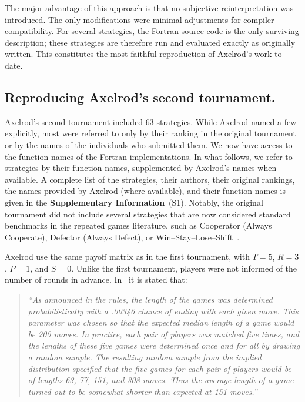 \documentclass{article}
\newcommand{\SI}{\textbf{Supplementary Information}}
\begin{document}
The major advantage of this approach is that no subjective reinterpretation was
introduced. The only modifications were minimal adjustments for compiler
compatibility. For several strategies, the Fortran source code is the only
surviving description; these strategies are therefore run and evaluated exactly
as originally written. This constitutes the most faithful reproduction of
Axelrod's work to date.

\subsection*{Reproducing Axelrod's second tournament.}

Axelrod's second tournament included 63 strategies. While Axelrod named a few
explicitly, most were referred to only by their ranking in the original
tournament or by the names of the individuals who submitted them. We now have
access to the function names of the Fortran implementations. In what follows, we
refer to strategies by their function names, supplemented by Axelrod's names
when available. A complete list of the strategies, their authors, their original
rankings, the names provided by Axelrod (where available), and their function
names is given in the \SI~(S1). Notably, the original tournament did not include
several strategies that are now considered standard benchmarks in the repeated games literature, such as Cooperator (Always
Cooperate), Defector (Always Defect), or Win--Stay--Lose--Shift~\cite{nowak1993strategy}.

Axelrod use the same payoff matrix as in the first tournament, with
\(T=5\), \(R=3\), \(P=1\), and \(S=0\).
Unlike the first tournament, players were not informed of the number of rounds
in advance. In~\cite{Axelrod1980b} it is stated that:

\begin{quote}
    \textit{``As announced in the rules, the length of the games was determined
        probabilistically with a .00346 chance of ending with each given move.
        This parameter was chosen so that the expected median length of a game
        would be 200 moves. In practice, each pair of players was matched five
        times, and the lengths of these five games were determined once and for
        all by drawing a random sample. The resulting random sample from the
        implied distribution specified that the five games for each pair of
        players would be of lengths 63, 77, 151, and 308 moves. Thus the average
        length of a game turned out to be somewhat shorter than expected at 151
        moves.''}
\end{quote}
\end{document}
